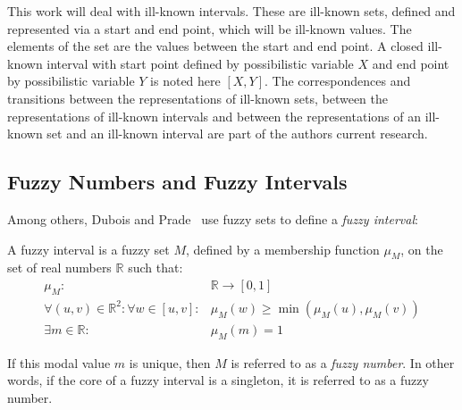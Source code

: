 This work will deal with ill-known intervals. These are ill-known sets, defined and represented via a start and end point, which will be ill-known values. The elements of the set are the values between the start and end point. A closed ill-known interval with start point defined by possibilistic variable $X$ and end point by possibilistic variable $Y$ is noted here $\left[X, Y\right]$. The correspondences and transitions between the representations of ill-known sets, between the representations of ill-known intervals and between the representations of an ill-known set and an ill-known interval are part of the authors current research.

\subsection{\label{subsec:fuzzy-numbers}Fuzzy Numbers and Fuzzy Intervals}
Among others, Dubois and Prade~\cite{Dubois1983} use fuzzy sets \cite{zadeh65} to define a \emph{fuzzy interval}:
\begin{definition}
A fuzzy interval is a fuzzy set $M$, defined by a membership function $\mu_{M}$, on the set of real numbers $\mathbb{R}$ such that:
\begin{eqnarray}
\mu_{M} : & \!\!\!\!\!\!\!\!\!\!\!\!\!\!\!\!\!\!\!\!\!\!\!\!\!\!\!\!\!\!\!\!\!\!\!\!\!\!\!\!\!\!\!\!\!\!\!\!\!\! \mathbb{R} \rightarrow \left[0,1\right] \nonumber \\ 
\forall (u,v)\in\mathbb{R}^2: \forall w \in [u,v]:&\mu_M(w) \geq\min(\mu_M(u),\mu_M(v))  \\
\exists m \in \mathbb{R} : & \!\!\!\!\!\!\!\!\!\!\!\!\!\!\!\!\!\!\!\!\!\!\!\!\!\!\!\!\!\!\!\!\!\!\!\!\!\!\!\!\!\!\!\!\!\!\!\! \mu_M(m)=1 
\end{eqnarray}
\end{definition}
If this modal value $m$ is unique, then $M$ is referred to as a \emph{fuzzy number}. In other words, if the core of a fuzzy interval is a singleton, it is referred to as a fuzzy number.



